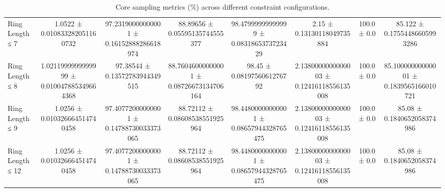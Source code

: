 \begin{table}[H]
\begin{tabular}{l c c c c c c c}
        Ring Length ≤ 7 & 1.0522 ± 0.010833282051160732 & 97.23190000000001 ± 0.16152888286618974 & 88.89656 ± 0.05595135744555377 & 98.47999999999999 ± 0.0831865373723429 & 2.15 ± 0.13130118049735884 & 100.0 ± 0.0 & 85.122 ± 0.17554486605993286 \\
        Ring Length ≤ 8 & 1.0211999999999999 ± 0.010047885349664368 & 97.38544 ± 0.13572783944349515 & 88.76046000000001 ± 0.08726673134706164 & 98.45 ± 0.0819756061276792 & 2.1380000000000003 ± 0.12416118556135008 & 100.0 ± 0.0 & 85.10000000000001 ± 0.1839565166010721 \\
        Ring Length ≤ 9 & 1.0256 ± 0.010326664514740458 & 97.40772000000001 ± 0.14788730033373065 & 88.72112 ± 0.08608538551925964 & 98.44800000000001 ± 0.08657944328765475 & 2.1380000000000003 ± 0.12416118556135008 & 100.0 ± 0.0 & 85.08 ± 0.1840652058374986 \\
        Ring Length ≤ 12 & 1.0256 ± 0.010326664514740458 & 97.40772000000001 ± 0.14788730033373065 & 88.72112 ± 0.08608538551925964 & 98.44800000000001 ± 0.08657944328765475 & 2.1380000000000003 ± 0.12416118556135008 & 100.0 ± 0.0 & 85.08 ± 0.1840652058374986 \\
        \bottomrule
    \end{tabular}
    \caption{Core sampling metrics (\%) across different constraint configurations.}
\end{table}
